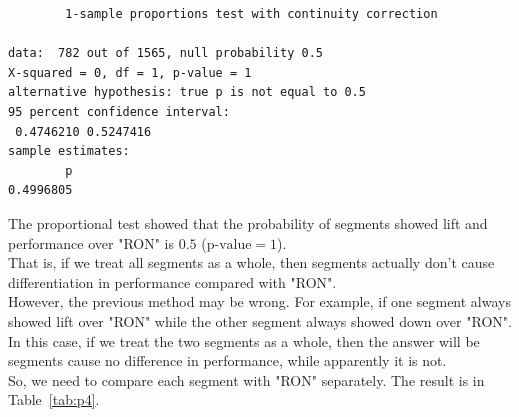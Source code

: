 \documentclass[12pt]{article}
\begin{document}
\begin{verbatim}
        1-sample proportions test with continuity correction

data:  782 out of 1565, null probability 0.5
X-squared = 0, df = 1, p-value = 1
alternative hypothesis: true p is not equal to 0.5
95 percent confidence interval:
 0.4746210 0.5247416
sample estimates:
        p
0.4996805
\end{verbatim}

The proportional test showed that the probability of segments showed lift and performance over "RON" is $0.5$ ($\text{p-value} = 1$). \\

That is, if we treat all segments as a whole, then segments actually don't cause differentiation in performance compared with "RON". \\

However, the previous method may be wrong. For example, if one segment always showed lift over "RON" while the other segment always showed down over "RON". In this case, if we treat the two segments as a whole, then the answer will be segments cause no difference in performance, while apparently it is not. \\

So, we need to compare each segment with "RON" separately. The result is in Table~\ref{tab:p4}. \\
\end{document}
